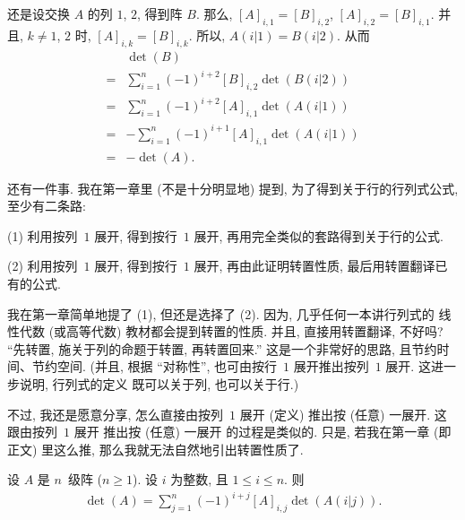\documentclass[%
    UTF8,%
    fontset=none,%
    punct=kaiming,%
    zihao=-4,%
    a4paper,%
    oneside,%
]{ctexbook}
\let\emph\relax
\renewcommand*{\leq}{\leqslant}
\renewcommand*{\geq}{\geqslant}
\begin{document}
还是设交换 \(A\) 的列 \(1\), \(2\),
得到阵 \(B\).
那么,
\([A]_{i,1} = [B]_{i,2}\),
\([A]_{i,2} = [B]_{i,1}\).
并且, \(k \neq 1\), \(2\) 时,
\([A]_{i,k} = [B]_{i,k}\).
所以, \(A(i|1) = B(i|2)\).
从而
\begin{align*}
         & \det {(B)}
    \\
    = {} &
    \sum_{i = 1}^{n}
    {(-1)^{i+2} [B]_{i,2} \det {(B(i|2))}}
    \\
    = {} &
    \sum_{i = 1}^{n}
    {(-1)^{i+2} [A]_{i,1} \det {(A(i|1))}}
    \\
    = {} & {-\sum_{i = 1}^{n}
    {(-1)^{i+1} [A]_{i,1} \det {(A(i|1))}}}
    \\
    = {} & {-\det {(A)}}.
\end{align*}

\vspace{2ex}

还有一件事.
我在第一章里 (不是十分明显地) 提到,
为了得到关于行的行列式公式,
至少有二条路:

(1)
利用按列~\(1\) 展开, 得到按行~\(1\) 展开,
再用完全类似的套路得到关于行的公式.

(2)
利用按列~\(1\) 展开, 得到按行~\(1\) 展开,
再由此证明转置性质,
最后用转置翻译已有的公式.

我在第一章简单地提了 (1),
但还是选择了 (2).
因为, 几乎任何一本讲行列式的%
线性代数 (或高等代数)
教材都会提到转置的性质.
并且, 直接用转置翻译, 不好吗?
``先转置,
施关于列的命题于转置,
再转置回来.''
这是一个非常好的思路,
且节约时间、节约空间.
(并且, 根据 ``对称性'',
也可由按行~\(1\) 展开推出按列~\(1\) 展开.
这进一步说明, 行列式的定义%
既可以关于列, 也可以关于行.)

不过, 我还是愿意分享,
怎么直接由按列~\(1\) 展开 (定义)
推出按 (任意) 一\emph{行}展开.
这跟由按列~\(1\) 展开%
推出按 (任意) 一\emph{列}展开%
的过程是类似的.
只是, 若我在第一章 (即正文) 里这么推,
那么我就无法自然地引出转置性质了.

\begin{theorem}
    设 \(A\) 是 \(n\)~级阵 (\(n \geq 1\)).
    设 \(i\) 为整数, 且 \(1 \leq i \leq n\).
    则
    \begin{align*}
        \det {(A)} = \sum_{j = 1}^{n}
        {(-1)^{i+j} [A]_{i,j} \det {(A(i|j))}}.
    \end{align*}
\end{theorem}
\end{document}
